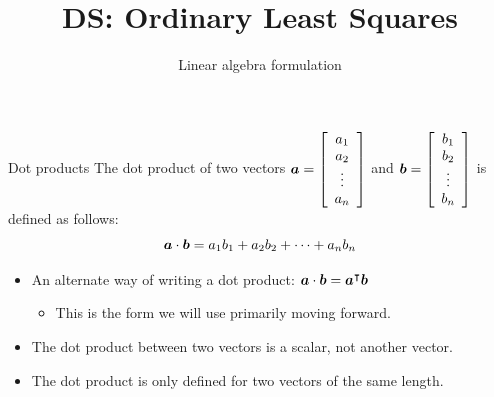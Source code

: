 \documentclass[aspectratio=169]{../latex_main/tntbeamer}  %
\title[Regression]{DS: Ordinary Least Squares}
\subtitle{Linear algebra formulation}
\begin{document}
	
	\maketitle
	\begin{frame}{Dot products}
	    The dot product of two vectors 		$\bm{a} = \left[\begin{array}{c}
	          a_1 \\
	          a_2 \\
	          \vdots\\
	          a_n
	    \end{array}\right]$	       and	$\bm{b} = \left[\begin{array}{c}
	          b_1 \\
	          b_2 \\
	          \vdots\\
	          b_n
	    \end{array}\right]$			   is defined as follows: 
	    \begin{equation*}
	        \bm{a} \cdot \bm{b} = a_1b_1 + a_2b_2 + \dots + a_nb_n
	    \end{equation*}
	   
    \begin{itemize}
        \item An alternate way of writing a dot product: $\bm{a}\cdot \bm{b} = \bm{a}^\intercal \bm{b}$
        \begin{itemize}
            \item This is the form we will use primarily moving forward.
        \end{itemize}
            \item The dot product between two vectors is a scalar, not another vector.
            \item The dot product is only defined for two vectors of the same length.  
    \end{itemize}

	\end{frame}
	
\end{document}
